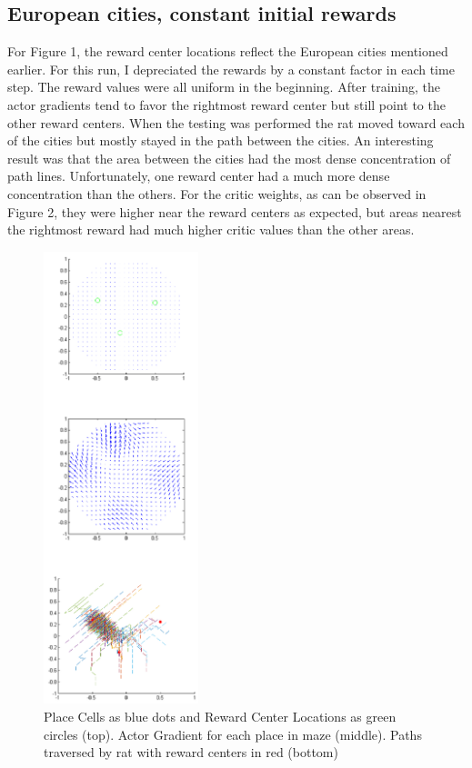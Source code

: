 \documentclass[conference]{IEEEtran}
\begin{document}
\subsection{European cities, constant initial rewards}

For Figure 1, the reward center locations reflect the European cities mentioned earlier. For this run, I depreciated the rewards by a constant factor in each time step. The reward values were all uniform in the beginning. After training, the actor gradients tend to favor the rightmost reward center but still point to the other reward centers. When the testing was performed the rat moved toward each of the cities but mostly stayed in the path between the cities. An interesting result was that the area between the cities had the most dense concentration of path lines. Unfortunately, one reward center had a much more dense concentration than the others. For the critic weights, as can be observed in Figure 2, they were higher near the reward centers as expected, but areas nearest the rightmost reward had much higher critic values than the other areas.

\begin{figure}
\includegraphics[width=0.4\textwidth]{waterMazeRevised2_Figure.png} 
\caption{Place Cells as blue dots and Reward Center Locations as green circles (top). Actor Gradient for each place in maze (middle). Paths traversed by rat with reward centers in red (bottom)}
\end{figure}
\end{document}
